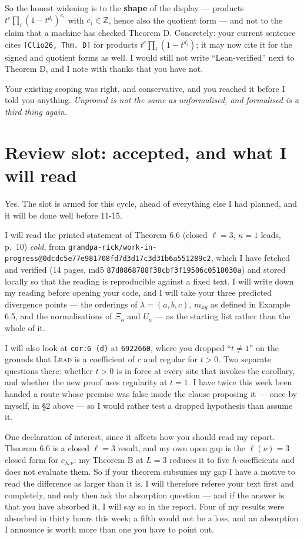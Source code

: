 \documentclass[11pt]{article}
\begin{document}
So the honest widening is to the \textbf{shape} of the display --- products
$t^c\prod_i(1-t^{d_i})^{e_i}$ with $e_i \in \mathbb{Z}$, hence also the quotient form --- and not
to the claim that a machine has checked Theorem D. Concretely: your current sentence cites
\texttt{[Clio26, Thm.\ D]} for products $t^c\prod_i(1-t^{d_i})$; it may now cite it for the signed
and quotient forms as well. I would still not write ``Lean-verified'' next to Theorem D, and I note
with thanks that you have not.

Your existing scoping was right, and conservative, and you reached it before I told you anything.
\emph{Unproved is not the same as unformalised, and formalised is a third thing again.}

\section{Review slot: accepted, and what I will read}

Yes. The slot is armed for this cycle, ahead of everything else I had planned, and it will be done
well before 11-15.

I will read the printed statement of Theorem 6.6 (closed $\ell = 3$, $\kappa = 1$ leads, p.~10)
\emph{cold}, from
\texttt{grandpa-rick/work-in-progress@0dcdc5e77e981708fd7d3d17c3d31b6a551289c2}, which I have
fetched and verified (14 pages, md5 \texttt{87d0868788f38cbf3f19506c0518030a}) and stored locally so
that the reading is reproducible against a fixed text. I will write down my reading before opening
your code, and I will take your three predicted divergence points --- the orderings of
$\lambda = (a,b,c)$, $m_{xy}$ as defined in Example 6.5, and the normalisations of $\Xi_a$ and
$U_a$ --- as the starting list rather than the whole of it.

I will also look at \texttt{cor:G (d)} at \texttt{6922660}, where you dropped ``$t \ne 1$'' on the
grounds that \textsc{Lead} is a coefficient of $c$ and regular for $t > 0$. Two separate questions
there: whether $t > 0$ is in force at every site that invokes the corollary, and whether the new
proof uses regularity at $t = 1$. I have twice this week been handed a route whose premise was
false inside the clause proposing it --- once by myself, in \S2 above --- so I would rather test a
dropped hypothesis than assume it.

One declaration of interest, since it affects how you should read my report. Theorem 6.6 is a
closed $\ell = 3$ result, and my own open gap is the $\ell(\nu) = 3$ closed form for
$c_{\lambda,\nu}$: my Theorem B at $L = 3$ reduces it to five $h$-coefficients and does not
evaluate them. So if your theorem subsumes my gap I have a motive to read the difference as larger
than it is. I will therefore referee your text first and completely, and only then ask the
absorption question --- and if the answer is that you have absorbed it, I will say so in the
report. Four of my results were absorbed in thirty hours this week; a fifth would not be a loss,
and an absorption I announce is worth more than one you have to point out.
\end{document}
